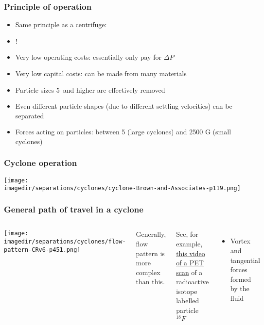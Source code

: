 \begin{frame}\frametitle{Principle of operation}
	\begin{itemize}
		\item	Same principle as a centrifuge: \textbf{{\color{myGreen}{density difference required}}}
		\item	{\color{myOrange}{No moving parts}}!
		\item	Very low operating costs: essentially only pay for $\Delta P$
		\item	Very low capital costs: can be made from many materials
		\item	Particle sizes 5\micron\, and higher are effectively removed
		\item	Even different particle shapes (due to different settling velocities) can be separated
		\item	Forces acting on particles: between 5 (large cyclones) and 2500 G (small cyclones)
	\end{itemize}	
\end{frame}

\begin{frame}\frametitle{Cyclone operation}
	\begin{center}
		\texttt{[image: \\imagedir/separations/cyclones/cyclone-Brown-and-Associates-p119.png]}
	\end{center}
\end{frame}

\begin{frame}\frametitle{General path of travel in a cyclone {}}
	\begin{columns}[c]
			\begin{center}
				\texttt{[image: \\imagedir/separations/cyclones/flow-pattern-CRv6-p451.png]}
			\end{center}
			Generally, flow pattern is more complex than this. 
			
			\vspace{12pt}			
			See, for example, \href{http://www.youtube.com/watch?v=CWLARs\_dJO0}{this video of a PET scan} of a radioactive isotope labelled particle $^{18}F$
			
			\vspace{12pt}
			\begin{itemize}
				\item	Vortex and tangential forces formed by the fluid
			\end{itemize}
	\end{columns}
\end{frame}

